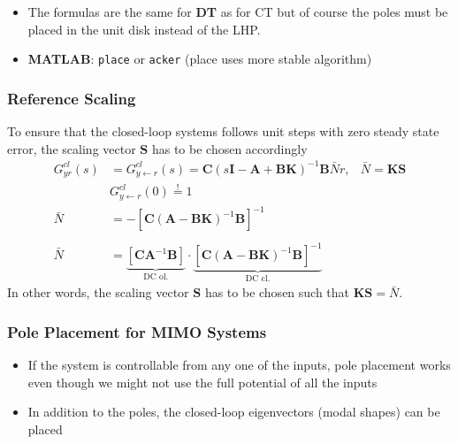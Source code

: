 \newpar{}

\begin{itemize}
    \item The formulas are the same for \textbf{DT} as for CT but of course the poles must be placed in the unit disk instead of the LHP.
    \item \textbf{MATLAB}: \texttt{place} or \texttt{acker} (place uses more stable algorithm)
\end{itemize}

\subsubsection{Reference Scaling}
To ensure that the closed-loop systems follows unit steps with zero steady state error, the scaling vector $\mathbf{S}$ has to be chosen accordingly
\noindent\begin{align*}
    G_{yr}^{cl}(s) & = G_{y\leftarrow r}^{cl}(s) =\mathbf{C}{(s\mathbf{I}-\mathbf{A}+\mathbf{BK})}^{-1}\mathbf{B}\bar{N}r,                                                                          & \bar{N}=\mathbf{KS} \\
                   & G_{y\leftarrow r}^{cl}(0)  \overset{!}{=} 1                                                                                                                                                          \\
    \bar{N}        & =-{\left[\mathbf{C}{(\mathbf{A}-\mathbf{BK})}^{-1}\mathbf{B}\right]}^{-1}                                                                                                                            \\\\
    \bar{N}        & =\underbrace{\left[\mathbf{CA}^{-1}\mathbf{B}\right]}_{\text{DC ol.}}\cdot\underbrace{{\left[\mathbf{C}{(\mathbf{A}-\mathbf{BK})}^{-1}\mathbf{B}\right]}^{-1}}_{\text{DC cl.}}
\end{align*}
In other words, the scaling vector $\mathbf{S}$ has to be chosen such that $\mathbf{KS}=\bar{N}$.

\subsubsection{Pole Placement for MIMO Systems}
\begin{itemize}
    \item If the system is controllable from any one of the inputs, pole placement works even though we might not use the full potential of all the inputs
    \item In addition to the poles, the closed-loop eigenvectors (modal shapes) can be placed
\end{itemize}
